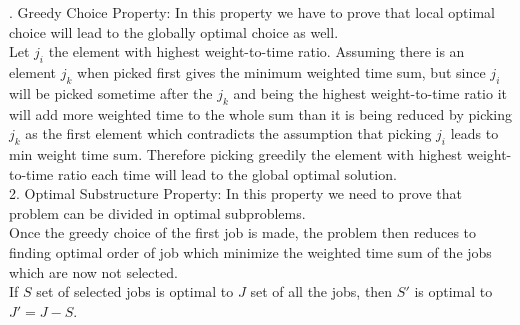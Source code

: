 \documentclass[a4paper,11pt]{article}
\theoremstyle{quest}
\newenvironment{solution}[2][Solution]{\begin{trivlist}
		\item[\hskip \labelsep {\bfseries #1}\hskip \labelsep {\bfseries #2.}]}{\end{trivlist}}
\begin{document}
\begin{solution}
	  1. Greedy Choice Property: In this property we have to prove that local optimal choice will lead to the globally optimal choice as well.\\
	  
	  Let $j_i$ the element with highest weight-to-time ratio. Assuming there is an element $j_k$ when picked first gives the minimum weighted time sum, but since $j_i$ will be picked sometime after the $j_k$ and being the highest weight-to-time ratio it will add more weighted time to the whole sum than it is being reduced by picking $j_k$ as the first element which contradicts the assumption that picking $j_i$ leads to min weight time sum. Therefore picking greedily the element with highest weight-to-time ratio each time will lead to the global optimal solution.\\
	  
	  2. Optimal Substructure Property: In this property we need to prove that problem can be divided in optimal subproblems.\\
	  
	  Once the greedy choice of the first job is made, the problem then reduces to finding optimal order of job which minimize the weighted time sum of the jobs which are now not selected.\\
	  
	  If $S$ set of selected jobs is optimal to $J$ set of all the jobs, then $S'$ is optimal to $J' = J-S$.
	  
\end{solution}
\end{document}
